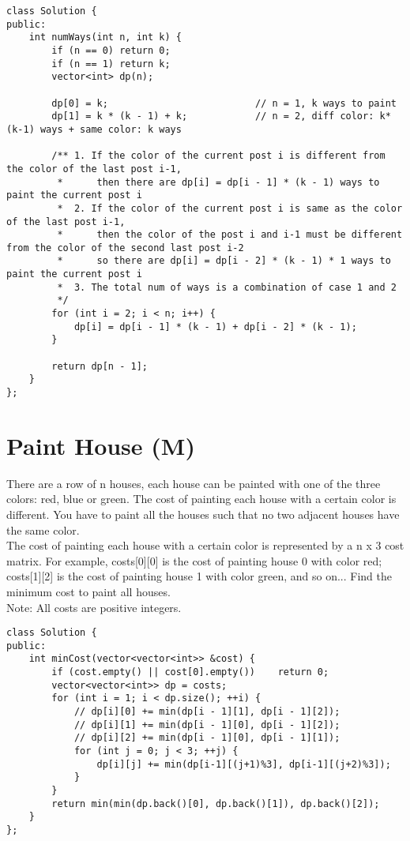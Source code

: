 \begin{lstlisting}
class Solution {
public:
    int numWays(int n, int k) {
        if (n == 0) return 0;
        if (n == 1) return k;
        vector<int> dp(n);
        
        dp[0] = k;                          // n = 1, k ways to paint
        dp[1] = k * (k - 1) + k;            // n = 2, diff color: k*(k-1) ways + same color: k ways
        
        /** 1. If the color of the current post i is different from the color of the last post i-1,
         *      then there are dp[i] = dp[i - 1] * (k - 1) ways to paint the current post i
         *  2. If the color of the current post i is same as the color of the last post i-1,
         *      then the color of the post i and i-1 must be different from the color of the second last post i-2
         *      so there are dp[i] = dp[i - 2] * (k - 1) * 1 ways to paint the current post i  
         *  3. The total num of ways is a combination of case 1 and 2
         */
        for (int i = 2; i < n; i++) {
            dp[i] = dp[i - 1] * (k - 1) + dp[i - 2] * (k - 1);
        }
        
        return dp[n - 1];
    }
};
\end{lstlisting}


\section{Paint House (M)}
There are a row of n houses, each house can be painted with one of the three colors: red, blue or green. The cost of painting each house with a certain color is different. You have to paint all the houses such that no two adjacent houses have the same color.\\

The cost of painting each house with a certain color is represented by a n x 3 cost matrix. For example, costs[0][0] is the cost of painting house 0 with color red; costs[1][2] is the cost of painting house 1 with color green, and so on... Find the minimum cost to paint all houses.\\

Note:
All costs are positive integers.\\

\begin{lstlisting}
class Solution {
public:
    int minCost(vector<vector<int>> &cost) {
        if (cost.empty() || cost[0].empty())    return 0;
        vector<vector<int>> dp = costs;
        for (int i = 1; i < dp.size(); ++i) {
            // dp[i][0] += min(dp[i - 1][1], dp[i - 1][2]);
            // dp[i][1] += min(dp[i - 1][0], dp[i - 1][2]);
            // dp[i][2] += min(dp[i - 1][0], dp[i - 1][1]);
            for (int j = 0; j < 3; ++j) {
                dp[i][j] += min(dp[i-1][(j+1)%3], dp[i-1][(j+2)%3]);
            }
        }
        return min(min(dp.back()[0], dp.back()[1]), dp.back()[2]);
    }
};
\end{lstlisting}


